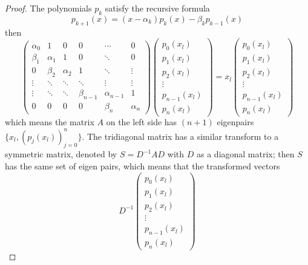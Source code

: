\begin{proof}
   The polynomials $p_k$ satisfy the recursive formula 
   $$p_{k+1}(x) = (x - \alpha_k) p_k(x) - \beta_k p_{k-1}(x)$$
   then 
   \begin{equation}
       \begin{pmatrix}
           \alpha_0 & 1 & 0 & 0 & \cdots & 0\\
           \beta_1 & \alpha_1 & 1 & 0 & \ddots & 0\\ 
           0 & \beta_2 & \alpha_2 &  1 & \ddots & \vdots  \\
           \vdots & \ddots & \ddots & \ddots & \vdots & \vdots \\
           \vdots & \ddots & \ddots & \beta_{n-1} & \alpha_{n-1} & 1 \\
           0 & 0 & 0 & 0 & \beta_n & \alpha_n
       \end{pmatrix}\begin{pmatrix}
           p_0(x_l) \\ p_1(x_l) \\ p_2(x_l) \\ \vdots \\ p_{n-1}(x_l) \\ p_n(x_l)
       \end{pmatrix} = x_l \begin{pmatrix}
        p_0(x_l) \\ p_1(x_l) \\  p_2(x_l) \\ \vdots \\ p_{n-1}(x_l) \\ p_n(x_l)
    \end{pmatrix}
   \end{equation}
   which means the matrix $A$ on the left side has $(n+1)$ eigenpairs $\{ x_l, (p_j(x_l))_{j=0}^n\} $. The tridiagonal matrix has a similar transform to a symmetric matrix, denoted by $S = D^{-1}A D$ with $D$ as a diagonal matrix; then $S$ has the same set of eigen pairs, which means that the transformed vectors 
   \begin{equation}
       D^{-1} \begin{pmatrix}
        p_0(x_l) \\ p_1(x_l) \\  p_2(x_l) \\ \vdots \\ p_{n-1}(x_l) \\ p_n(x_l)
       \end{pmatrix}
   \end{equation}

\end{proof}
